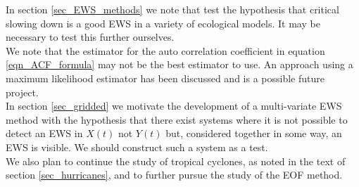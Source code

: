 \documentclass[11pt,a4paper,reqno]{article}
\numberwithin{equation}{section}
\begin{document}
In section \ref{sec_EWS_methods} we note that \cite{vannes2007} test the hypothesis that critical slowing down is a good EWS in a variety of ecological models. It may be necessary to test this further ourselves.\\

We note that the estimator for the auto correlation coefficient in equation \ref{eqn_ACF_formula} may not be the best estimator to use. An approach using a maximum likelihood estimator has been discussed and is a possible future project.\\

In section \ref{sec_gridded} we motivate the development of a multi-variate EWS method with the hypothesis that there exist systems where it is not possible to detect an EWS in $X(t)$ not $Y(t)$ but, considered together in some way, an EWS is visible. We should construct such a system as a test.\\

We also plan to continue the study of tropical cyclones, as noted in the text of section \ref{sec_hurricanes}, and to further pursue the study of the EOF method.

\newpage

\end{document}
